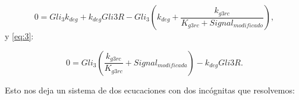 \begin{equation}
0 = Gli_3k_{deg}+k_{deg}Gli3R-Gli_3\left(k_{deg}+\frac{k_{g3rc}}{K_{g3rc}+Signal_{modificado}}\right),
\label{eq:2-modified}
\end{equation}
y \ref{eq:3}:

\begin{equation}
0=Gli_3\left(\frac{k_{g3rc}}{K_{g3rc}}+Signal_{modificada}\right)-k_{deg}Gli3R.
	\label{eq:3-modified}
\end{equation}

Esto nos deja un sistema de dos ecucaciones con dos incógnitas que resolvemos:








